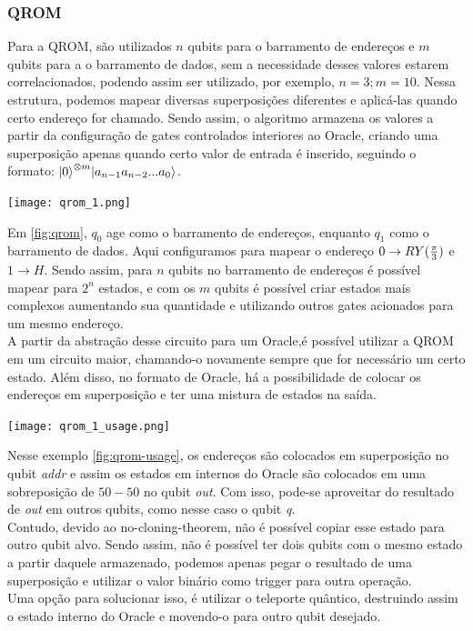 \documentclass{article}
\begin{document}
\subsubsection{QROM}
Para a QROM, são utilizados $n$ qubits para o barramento de endereços e $m$ qubits para a o barramento de dados, sem a necessidade desses valores estarem correlacionados, podendo assim ser utilizado, por exemplo, $n=3; m=10$. Nessa estrutura, podemos mapear diversas superposições diferentes e aplicá-las quando certo endereço for chamado. Sendo assim, o algoritmo armazena os valores a partir da configuração de gates controlados interiores ao Oracle, criando uma superposição apenas quando certo valor de entrada é inserido, seguindo o formato: ${\ket{0}^{\otimes m}} {\ket{a_{n-1} a_{n-2} ... a_0}}$.

\begin{center}
	\texttt{[image: qrom\_1.png]}
	\label{fig:qrom}
\end{center}


Em \ref{fig:qrom}, $q_{0}$ age como o barramento de endereços, enquanto $q_{1}$ como o barramento de dados. Aqui configuramos para mapear o endereço $0 \to RY({\pi\over{3}})$ e $1 \to H$. Sendo assim, para $n$ qubits no barramento de endereços é possível mapear para $2^{n}$ estados, e com os $m$ qubits é possível criar estados mais complexos aumentando sua quantidade e utilizando outros gates acionados para um mesmo endereço. \\
A partir da abstração desse circuito para um Oracle,é possível utilizar a QROM em um circuito maior, chamando-o novamente sempre que for necessário um certo estado. Além disso, no formato de Oracle, há a possibilidade de colocar os endereços em superposição e ter uma mistura de estados na saída.

\begin{center}
	\texttt{[image: qrom\_1\_usage.png]}
	\label{fig:qrom-usage}
\end{center}

Nesse exemplo \ref{fig:qrom-usage}, os endereços são colocados em superposição no qubit \emph{addr} e assim os estados em internos do Oracle são colocados em uma sobreposição de $50-50$ no qubit \emph{out}. Com isso, pode-se aproveitar do resultado de \emph{out} em outros qubits, como nesse caso o qubit \emph{q}.\\
Contudo, devido ao no-cloning-theorem, não é possível copiar esse estado para outro qubit alvo. Sendo assim, não é possível ter dois qubits com o mesmo estado a partir daquele armazenado, podemos apenas pegar o resultado de uma superposição e utilizar o valor binário como trigger para outra operação.\\
Uma opção para solucionar isso, é utilizar o teleporte quântico, destruindo assim o estado interno do Oracle e movendo-o para outro qubit desejado.
\end{document}
